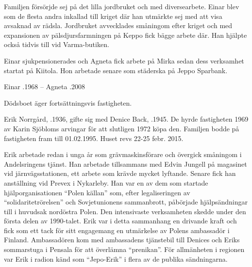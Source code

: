 Familjen försörjde sej på det lilla jordbruket och med diversearbete. Einar blev som de flesta andra inkallad till kriget där han utmärkte sej med att visa avsaknad av rädsla. Jordbruket avvecklades småningom efter kriget och med expansionen av pälsdjursfarmningen på Keppo fick bägge arbete där. Han hjälpte också tidvis till vid Varma-butiken.

Einar sjukpensionerades och Agneta fick arbete på Mirka sedan dess verksamhet startat på Kiitola. Hon arbetade senare som städerska på Jeppo Sparbank.
\begin{jhchildren}
  \item {}
  \item {}
  \item {}
  \item {}
\end{jhchildren}

Einar .1968  --  Agneta .2008

Dödsboet äger fortsättningsvis fastigheten.




Erik Norrgård, .1936, gifte sig med Denice Back, .1945. De hyrde fastigheten 1969 av Karin Sjöbloms arvingar för att slutligen 1972 köpa den. Familjen bodde på fastigheten fram till 01.02.1995. Huset revs 22-25 febr. 2015.

Erik arbetade redan i unga år som grävmaskinsförare och övergick småningom i Andelsringens tjänst. Han arbetade tillsammans med Edvin Jungell på magasinet vid järnvägsstationen, ett arbete som krävde mycket lyftande.  Senare fick han anställning vid Prevex i Nykarleby. Han var en av dem som startade hjälporganisationen ``Polen källan'' som, efter legaliseringen av ``solidaritetrörelsen'' och Sovjetunionens sammanbrott, påbörjade hjälpsändningar till i huvudsak nordöstra Polen. Den intensivaste verksamheten skedde under den första delen av 1990-talet. Erik var i detta sammanhang en drivande kraft och fick som ett tack för sitt engagemang en utmärkelse av Polens ambassadör i Finland. Ambassadören kom med ambassadens tjänstebil till Denices och Eriks sommarstuga i Pensala för att överlämna ``prenikan''. För allmänheten i regionen var Erik i radion känd som ``Jepo-Erik'' i flera av de publika sändningarna.

